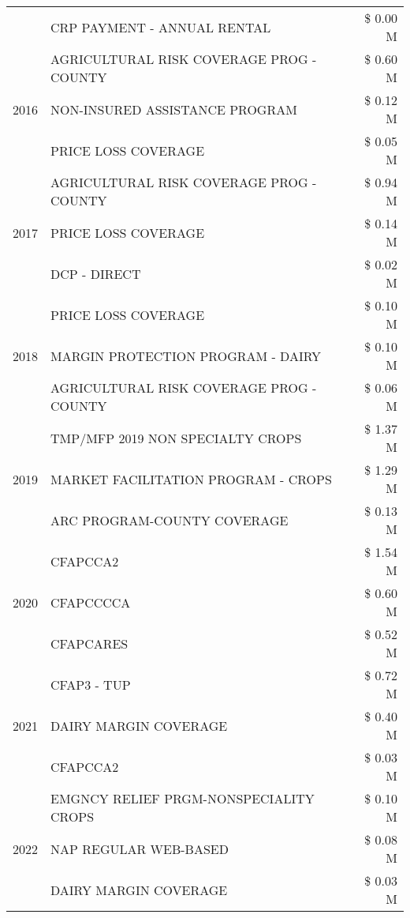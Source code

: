 \begin{tabular}{llr}
 & CRP PAYMENT - ANNUAL RENTAL & \$ 0.00 M \\
\cline{1-3}
\multirow[t]{3}{*}{2016} & AGRICULTURAL RISK COVERAGE PROG - COUNTY & \$ 0.60 M \\
 & NON-INSURED ASSISTANCE PROGRAM & \$ 0.12 M \\
 & PRICE LOSS COVERAGE & \$ 0.05 M \\
\cline{1-3}
\multirow[t]{3}{*}{2017} & AGRICULTURAL RISK COVERAGE PROG - COUNTY & \$ 0.94 M \\
 & PRICE LOSS COVERAGE & \$ 0.14 M \\
 & DCP - DIRECT & \$ 0.02 M \\
\cline{1-3}
\multirow[t]{3}{*}{2018} & PRICE LOSS COVERAGE & \$ 0.10 M \\
 & MARGIN PROTECTION PROGRAM - DAIRY & \$ 0.10 M \\
 & AGRICULTURAL RISK COVERAGE PROG - COUNTY & \$ 0.06 M \\
\cline{1-3}
\multirow[t]{3}{*}{2019} & TMP/MFP 2019 NON SPECIALTY CROPS & \$ 1.37 M \\
 & MARKET FACILITATION PROGRAM - CROPS & \$ 1.29 M \\
 & ARC PROGRAM-COUNTY COVERAGE & \$ 0.13 M \\
\cline{1-3}
\multirow[t]{3}{*}{2020} & CFAPCCA2 & \$ 1.54 M \\
 & CFAPCCCCA & \$ 0.60 M \\
 & CFAPCARES & \$ 0.52 M \\
\cline{1-3}
\multirow[t]{3}{*}{2021} & CFAP3 - TUP & \$ 0.72 M \\
 & DAIRY MARGIN COVERAGE & \$ 0.40 M \\
 & CFAPCCA2 & \$ 0.03 M \\
\cline{1-3}
\multirow[t]{3}{*}{2022} & EMGNCY RELIEF PRGM-NONSPECIALITY CROPS & \$ 0.10 M \\
 & NAP REGULAR WEB-BASED & \$ 0.08 M \\
 & DAIRY MARGIN COVERAGE & \$ 0.03 M \\
\cline{1-3}
\bottomrule
\end{tabular}
